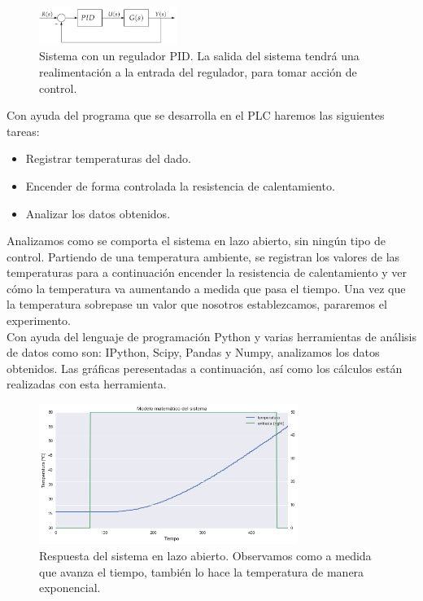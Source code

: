 \begin{figure}[H]
    \centering
    \includegraphics[width=0.4\textwidth]{images/PLC/sistema.png}
    \caption[Sistema con un regulador PID.]{Sistema con un regulador PID. La salida del sistema tendrá una realimentación a la entrada del regulador, para tomar acción de control.}
    \label{fig:plc_sistema}
\end{figure}

Con ayuda del programa que se desarrolla en el PLC haremos las siguientes tareas:

\begin{itemize}
    \item{Registrar temperaturas del dado.}
    \item{Encender de forma controlada la resistencia de calentamiento.}
    \item{Analizar los datos obtenidos.}
\end{itemize}

Analizamos como se comporta el sistema en lazo abierto, sin ningún tipo de control. Partiendo de una temperatura ambiente, se registran los valores de las temperaturas para a continuación encender la resistencia de calentamiento y ver cómo la temperatura va aumentando a medida que pasa el tiempo. Una vez que la temperatura sobrepase un valor que nosotros establezcamos, pararemos el experimento.\\

Con ayuda del lenguaje de programación Python y varias herramientas de análisis de datos como son: IPython, Scipy, Pandas y Numpy, analizamos los datos obtenidos. Las gráficas peresentadas a continuación, así como los cálculos están realizadas con esta herramienta.

\begin{figure}[H]
    \centering
    \includegraphics[width=0.75\textwidth]{images/PLC/modelado/modelado_9_1.png}
    \caption[Respuesta del sistema en lazo abierto]{Respuesta del sistema en lazo abierto. Observamos como a medida que avanza el tiempo, también lo hace la temperatura de manera exponencial.}
    \label{fig:plc_lazo_abierto}
\end{figure}

